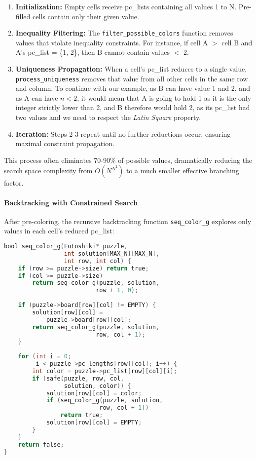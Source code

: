 \begin{enumerate}
    \item \textbf{Initialization:} Empty cells receive pc\_lists containing all values 1 to N. Pre-filled cells contain only their given value.
    
    \item \textbf{Inequality Filtering:} The \texttt{filter\_possible\_colors} function removes values that violate inequality constraints. For instance, if cell A $\gt$ cell B and A's pc\_list = \{1, 2\}, then B cannot contain values $\lt$ 2.
    
    \item \textbf{Uniqueness Propagation:} When a cell's pc\_list reduces to a single value, \texttt{process\_uniqueness} removes that value from all other cells in the same row and column. To continue with our example, as B can have value 1 and 2, and as A can have $n \lt 2$, it would mean that A is going to hold 1 as it is the only integer strictly lower than 2, and B therefore would hold 2, as its pc\_list had two values and we need to respect the \textit{Latin Square} property.
    
    \item \textbf{Iteration:} Steps 2-3 repeat until no further reductions occur, ensuring maximal constraint propagation.
\end{enumerate}

This process often eliminates 70-90\% of possible values, dramatically reducing the search space complexity from $O(N^{N^2})$ to a much smaller effective branching factor.

\paragraph{Backtracking with Constrained Search}
\label{par:backtrack_with_csp}
After pre-coloring, the recursive backtracking function \texttt{seq\_color\_g} explores only values in each cell's reduced pc\_list:

\begin{lstlisting}[language=C, caption=Sequential backtracking core, label={listing:precoloring}]
bool seq_color_g(Futoshiki* puzzle, 
                 int solution[MAX_N][MAX_N], 
                 int row, int col) {
    if (row >= puzzle->size) return true;
    if (col >= puzzle->size) 
        return seq_color_g(puzzle, solution, 
                          row + 1, 0);
    
    if (puzzle->board[row][col] != EMPTY) {
        solution[row][col] = 
            puzzle->board[row][col];
        return seq_color_g(puzzle, solution, 
                          row, col + 1);
    }
    
    for (int i = 0; 
         i < puzzle->pc_lengths[row][col]; i++) {
        int color = puzzle->pc_list[row][col][i];
        if (safe(puzzle, row, col, 
                 solution, color)) {
            solution[row][col] = color;
            if (seq_color_g(puzzle, solution, 
                           row, col + 1))
                return true;
            solution[row][col] = EMPTY;
        }
    }
    return false;
}
\end{lstlisting}

